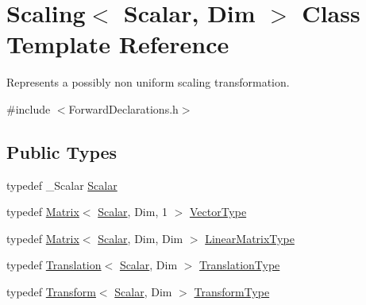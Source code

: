 \hypertarget{class_scaling}{\section{Scaling$<$ Scalar, Dim $>$ Class Template Reference}
\label{class_scaling}
}


Represents a possibly non uniform scaling transformation.  




{\ttfamily \#include $<$Forward\-Declarations.\-h$>$}

\subsection*{Public Types}
\begin{DoxyCompactItemize}
\item 
typedef \-\_\-\-Scalar \hyperlink{class_scaling_a3e27d3992328c2ebeb624ddc129659d1}{Scalar}
\item 
typedef \hyperlink{class_matrix}{Matrix}$<$ \hyperlink{class_scaling_a3e27d3992328c2ebeb624ddc129659d1}{Scalar}, Dim, 1 $>$ \hyperlink{class_scaling_a48ec70d6974c8d2c90ad7ca7a5c16f97}{Vector\-Type}
\item 
typedef \hyperlink{class_matrix}{Matrix}$<$ \hyperlink{class_scaling_a3e27d3992328c2ebeb624ddc129659d1}{Scalar}, Dim, Dim $>$ \hyperlink{class_scaling_a6c8c9048c2ccf7378efb46c075ec7333}{Linear\-Matrix\-Type}
\item 
typedef \hyperlink{class_translation}{Translation}$<$ \hyperlink{class_scaling_a3e27d3992328c2ebeb624ddc129659d1}{Scalar}, Dim $>$ \hyperlink{class_scaling_ad5f1911d0d47a289f53407e56465b5c5}{Translation\-Type}
\item 
typedef \hyperlink{class_transform}{Transform}$<$ \hyperlink{class_scaling_a3e27d3992328c2ebeb624ddc129659d1}{Scalar}, Dim $>$ \hyperlink{class_scaling_acee313a178d65c86e0de34b9b9cc4f7f}{Transform\-Type}
\end{DoxyCompactItemize}
